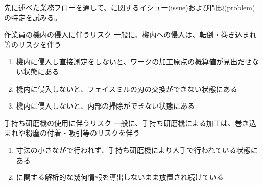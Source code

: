 

先に述べた業務フローを通して、\MMC に関するイシュー(issue)および問題(problem)の特定を試みる。




\begin{Issues}{作業員の機内の侵入に伴うリスク}
一般に、機内への侵入は、転倒・巻き込まれ等のリスクを伴う
\begin{enumerate}[label=\sarrow]
\item[{\sarrow[red]}]
機内に侵入し直接測定をしないと、ワークの加工原点の概算値が見出だせない状態にある
\item[{\sarrow[red]}] 機内に侵入しないと、フェイスミルの刃の交換ができない状態にある
\item 機内に侵入しないと、内部の掃除ができない状態にある
\end{enumerate}
\end{Issues}
\begin{Issues}{手持ち研磨機の使用に伴うリスク}
一般に、手持ち研磨機による加工は、巻き込まれや粉塵の付着・吸引等のリスクを伴う
\begin{enumerate}[label=\sarrow]
\item[{\sarrow[red]}]
寸法の小さな\EndFaceCChamferMilling が\MMC で行われず、手持ち研磨機により人手で行われている状態にある
\item[{\sarrow[red]}] \EndFaceCChamferMilling に関する解析的な幾何情報を導出しないまま放置され続けている
\end{enumerate}
\end{Issues}
